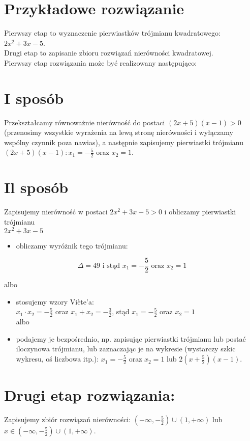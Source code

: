 \documentclass[10pt]{article}
\begin{document}
\section*{Przykładowe rozwiązanie}
Pierwszy etap to wyznaczenie pierwiastków trójmianu kwadratowego: $2 x^{2}+3 x-5$.\\
Drugi etap to zapisanie zbioru rozwiązań nierówności kwadratowej.\\
Pierwszy etap rozwiązania może być realizowany następująco:

\section*{I sposób}
Przekształcamy równoważnie nierówność do postaci $(2 x+5)(x-1)>0$ (przenosimy wszystkie wyrażenia na lewą stronę nierówności i wyłączamy wspólny czynnik poza nawias), a następnie zapisujemy pierwiastki trójmianu $(2 x+5)(x-1): x_{1}=-\frac{5}{2}$ oraz $x_{2}=1$.

\section*{Il sposób}
Zapisujemy nierówność w postaci $2 x^{2}+3 x-5>0$ i obliczamy pierwiastki trójmianu\\
$2 x^{2}+3 x-5$

\begin{itemize}
  \item obliczamy wyróżnik tego trójmianu:
\end{itemize}

$$
\Delta=49 \text { i stąd } x_{1}=-\frac{5}{2} \text { oraz } x_{2}=1
$$

albo

\begin{itemize}
  \item stosujemy wzory Viète'a:\\
$x_{1} \cdot x_{2}=-\frac{5}{2}$ oraz $x_{1}+x_{2}=-\frac{3}{2}$, stąd $x_{1}=-\frac{5}{2}$ oraz $x_{2}=1$\\
albo
  \item podajemy je bezpośrednio, np. zapisując pierwiastki trójmianu lub postać iloczynowa trójmianu, lub zaznaczając je na wykresie (wystarczy szkic wykresu, oś liczbowa itp.): $x_{1}=-\frac{5}{2}$ oraz $x_{2}=1$ lub $2\left(x+\frac{5}{2}\right)(x-1)$.
\end{itemize}

\section*{Drugi etap rozwiązania:}
Zapisujemy zbiór rozwiązań nierówności: $\left(-\infty,-\frac{5}{2}\right) \cup(1,+\infty)$ lub $x \in\left(-\infty,-\frac{5}{2}\right) \cup(1,+\infty)$.
\end{document}
